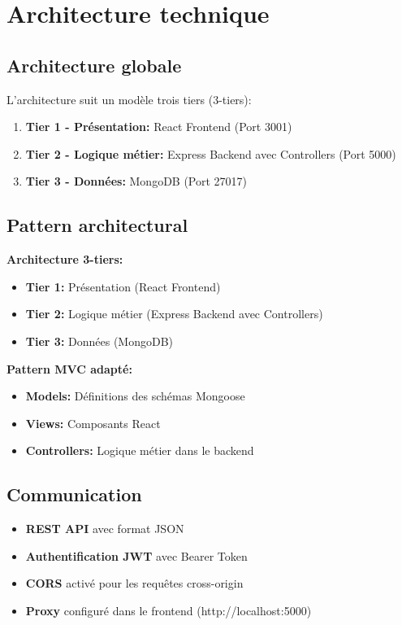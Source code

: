 \documentclass[12pt,a4paper]{article}
\begin{document}
\section{Architecture technique}

\subsection{Architecture globale}

L'architecture suit un modèle trois tiers (3-tiers):

\begin{enumerate}
    \item \textbf{Tier 1 - Présentation:} React Frontend (Port 3001)
    \item \textbf{Tier 2 - Logique métier:} Express Backend avec Controllers (Port 5000)
    \item \textbf{Tier 3 - Données:} MongoDB (Port 27017)
\end{enumerate}

\subsection{Pattern architectural}

\textbf{Architecture 3-tiers:}
\begin{itemize}
    \item \textbf{Tier 1:} Présentation (React Frontend)
    \item \textbf{Tier 2:} Logique métier (Express Backend avec Controllers)
    \item \textbf{Tier 3:} Données (MongoDB)
\end{itemize}

\textbf{Pattern MVC adapté:}
\begin{itemize}
    \item \textbf{Models:} Définitions des schémas Mongoose
    \item \textbf{Views:} Composants React
    \item \textbf{Controllers:} Logique métier dans le backend
\end{itemize}

\subsection{Communication}

\begin{itemize}
    \item \textbf{REST API} avec format JSON
    \item \textbf{Authentification JWT} avec Bearer Token
    \item \textbf{CORS} activé pour les requêtes cross-origin
    \item \textbf{Proxy} configuré dans le frontend (http://localhost:5000)
\end{itemize}
\end{document}
